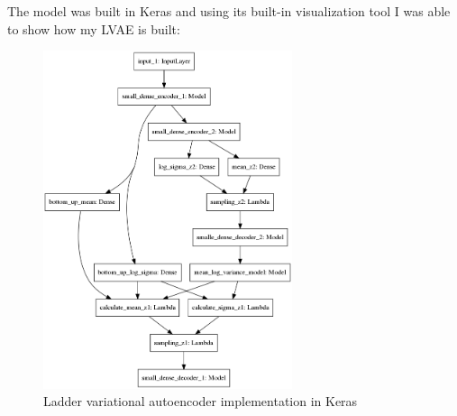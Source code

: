\documentclass[11pt, english]{article}
\begin{document}
\par The model was built in Keras \cite{chollet2015keras} and using its built-in visualization tool I was able to show how my LVAE is built:

\begin{figure}[H]
    \centering
    \includegraphics[width=0.65\textwidth]{lvae_keras.png}
    \caption{Ladder variational autoencoder implementation in Keras}
\end{figure}

\newpage
\printbibliography
\end{document}
